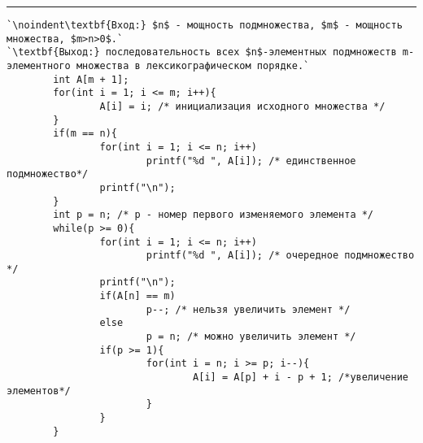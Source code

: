 \vspace{5pt} \hrule

\begin{lstlisting}[caption={Генерация $n$-элементарных подмножеств $m$-элементарного множества}, label=p138_calc_function, escapechar=`]
`\noindent\textbf{Вход:} $n$ - мощность подмножества, $m$ - мощность множества, $m>n>0$.`
`\textbf{Выход:} последовательность всех $n$-элементных подмножеств m-элементного множества в лексикографическом порядке.`
        int A[m + 1];
        for(int i = 1; i <= m; i++){
                A[i] = i; /* инициализация исходного множества */
        }
        if(m == n){
                for(int i = 1; i <= n; i++)
                        printf("%d ", A[i]); /* единственное подмножество*/
                printf("\n");
        }
        int p = n; /* p - номер первого изменяемого элемента */
        while(p >= 0){
                for(int i = 1; i <= n; i++)
                        printf("%d ", A[i]); /* очередное подмножество */
                printf("\n");
                if(A[n] == m)
                        p--; /* нельзя увеличить элемент */
                else
                        p = n; /* можно увеличить элемент */
                if(p >= 1){
                        for(int i = n; i >= p; i--){
                                A[i] = A[p] + i - p + 1; /*увеличение элементов*/
                        }
                }
        }
\end{lstlisting}
